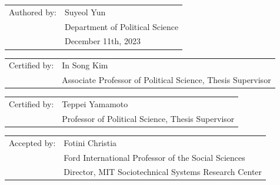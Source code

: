 \documentclass[15pt,letterpaper]{article}
\begin{document}
\begin{titlepage}

  

 
\begin{tabular}{@{}ll@{}}
  Authored by: & Suyeol Yun \\
               & Department of Political Science \\
               & December 11th, 2023 \\
\end{tabular}

\vspace{0.5cm} %


\begin{tabular}{@{}ll@{}}
  Certified by: & In Song Kim \\
                & Associate Professor of Political Science, Thesis Supervisor \\
\end{tabular}

\vspace{0.5cm} %

\begin{tabular}{@{}ll@{}}
  Certified by: & Teppei Yamamoto \\
                & Professor of Political Science, Thesis Supervisor \\
\end{tabular}

\vspace{0.5cm} %

  
\begin{tabular}{@{}ll@{}}
  Accepted by: & Fotini Christia \\
               & Ford International Professor of the Social Sciences \\
               & Director, MIT Sociotechnical Systems Research Center \\
\end{tabular}

\end{titlepage}
\end{document}
